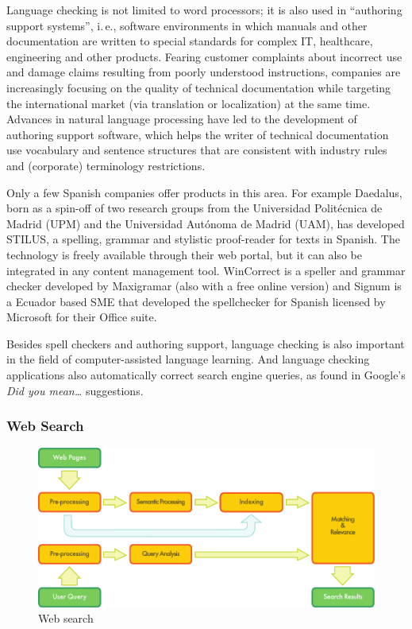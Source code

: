 \begin{multicols}{2}

Language checking is not limited to word processors; it is also used in “authoring support systems”, i.\,e., software environments in which manuals and other documentation are written to special standards for complex IT, healthcare, engineering and other products. Fearing customer complaints about incorrect use and damage claims resulting from poorly understood instructions, companies are increasingly focusing on the quality of technical documentation while targeting the international market (via translation or localization) at the same time. Advances in natural language processing have led to the development of authoring support software, which helps the writer of technical documentation use vocabulary and sentence structures that are consistent with industry rules and (corporate) terminology restrictions.

Only a few Spanish companies offer products in this area. For example Daedalus, born as a spin-off of two research groups from the Universidad Politécnica de Madrid (UPM) and the Universidad Autónoma de Madrid (UAM), has developed STILUS, a spelling, grammar and stylistic proof-reader for texts in Spanish. The technology is freely available through their web portal, but it can also be integrated in any content management tool. WinCorrect is a speller and grammar checker developed by Maxigramar (also with a free online version) and Signum is a Ecuador based SME that developed the spellchecker for Spanish licensed by Microsoft for their Office suite.

Besides spell checkers and authoring support, language checking is also important in the field of computer-assisted language learning. And language checking applications also automatically correct search engine queries, as found in Google's \textit{Did you mean\ldots} suggestions.

\subsubsection{Web Search}

\begin{figure}[htb]
  \center
  \includegraphics[width=\textwidth]{../_media/english/web_search_architecture}
  \caption{Web search}
\label{fig:websearcharch_en}
 \end{figure}


\end{multicols}
